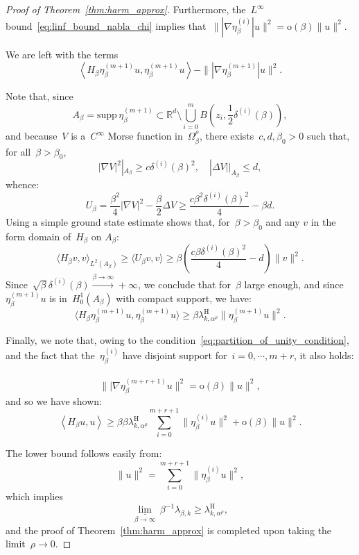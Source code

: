 \documentclass[10pt]{article}
\newcommand{\R}{\mathbb{R}}
\newcommand{\1}{\mathbbm 1}
\newcommand{\supp}{\mathrm{supp}}
\newcommand{\shift}{\rho} %
\newcommand{\deltai}{\delta^{(i)}}
\begin{document}
\begin{proof}[Proof of Theorem~\ref{thm:harm_approx}]
        Furthermore, the~$L^\infty$ bound~\eqref{eq:linf_bound_nabla_chi} implies that~$\||\nabla\eta_\beta^{(i)}|u\|^2 = \mathrm{o}(\beta)\|u\|^2$.

        We are left with the terms
        \[\left\langle H_\beta \eta_\beta^{(m+1)}u,\eta_\beta^{(m+1)}u\right\rangle - \||\nabla \eta_\beta^{(m+1)}|u\|^2.\]

        Note that, since
       ~$$ A_\beta = \supp\,\eta_\beta^{(m+1)} \subset \R^d\setminus \bigcup_{i=0}^m B\left(z_i,\frac12\deltai(\beta)\right),$$
        and because~$V$ is a~$C^\infty$ Morse function in~$ \Omega_\beta^\shift$, there exists~$c,d,\beta_0>0$ such that, for all~$\beta>\beta_0$,
        \[|\nabla V|^2 |_{A_\beta} \geq c\deltai(\beta)^2,\quad |\Delta V| |_{A_\beta} \leq d,\]
        whence:
        \[U_\beta=\frac{\beta^2}4|\nabla V|^2 -\frac\beta 2 \Delta V \geq  \frac{c\beta^2 \deltai(\beta)^2}{4}-\beta d.\]
        Using a simple ground state estimate shows that, for~$\beta>\beta_0$ and any $v$ in the form domain of~$H_\beta$ on $A_\beta$:
        \[\langle H_\beta v,v\rangle_{L^2(A_\beta)} \geq \langle U_\beta v,v\rangle \geq \beta\left(\frac{c\beta\deltai(\beta)^2}{4}-d\right)\|v\|^2.\]
        Since~$\sqrt\beta\deltai(\beta)\overset{\beta\to\infty}{\longrightarrow} +\infty$, we conclude that for~$\beta$ large enough, and since~$\eta_\beta^{(m+1)}u$ is in~$H_0^1(A_\beta)$ with compact support, we have:
        \[\langle H_\beta \eta_\beta^{(m+1)}u,\eta_\beta^{(m+1)}u\rangle \geq \beta\lambda_{k,\alpha^\shift}^{\mathrm{H}}\|\eta_\beta^{(m+1)}u\|^2.\]

        Finally, we note that, owing to the condition~\eqref{eq:partition_of_unity_condition}, and the fact that the~$\eta_\beta^{(i)}$ have disjoint support for~$i=0,\dotsm,m+r$, it also holds:
       ~$$\||\nabla \eta_\beta^{(m+r+1)}u\|^2 = \mathrm{o}(\beta)\|u\|^2,$$
        and so we have shown:
        \begin{equation}
            \left\langle H_\beta u,u \right\rangle \geq \beta  \beta\lambda_{k,\alpha^\shift}^{\mathrm H} \sum_{i=0}^{m+r+1}\|\eta_\beta^{(i)}u\|^2 + \mathrm o(\beta)\|u\|^2.
        \end{equation}

        The lower bound follows easily from:
       ~$$\|u\|^2 = \sum_{i=0}^{m+r+1} \|\eta_\beta^{(i)}u\|^2,$$
       which implies
       \[\underset{\beta\to\infty}{\underline\lim}\,\beta^{-1}\lambda_{\beta,k}\geq \lambda_{k,\alpha^\shift}^{\mathrm H},\]
        and the proof of Theorem~\ref{thm:harm_approx} is completed upon taking the limit~$\shift\to 0$.


\end{proof}
\end{document}
